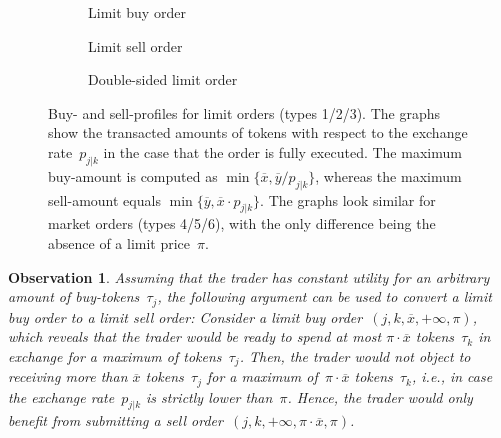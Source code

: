 \documentclass[11pt,parskip=full]{scrartcl}%
\newcommand*{\ie}{i.e., }
\newtheorem{observation}[theorem]{Observation}
\begin{document}
\begin{figure}
  \begin{subfigure}{0.45\textwidth}
    
    \caption{Limit buy order}
  \end{subfigure}
  \hfill
  \begin{subfigure}{0.45\textwidth}
    
    \caption{Limit sell order}
  \end{subfigure}

  \vspace{.8cm}
  \begin{subfigure}{0.45\textwidth}
    
    \caption{Double-sided limit order}
  \end{subfigure}
  \hfill
  \begin{subfigure}{0.45\textwidth}
  \end{subfigure}
  \caption{
    Buy- and sell-profiles for limit orders (types 1/2/3).
    The graphs show the transacted amounts of tokens with respect to the exchange rate~$p_{j|k}$
    in the case that the order is fully executed.
    The maximum buy-amount is computed as $\min\{\overline{x},\overline{y}/p_{j|k}\}$, whereas the
    maximum sell-amount equals $\min\{\overline{y},\overline{x} \cdot p_{j|k}\}$.
    The graphs look similar for market orders (types 4/5/6), with the only difference being the
    absence of a limit price~$\pi$.}
  \label{fig:buy_sell_demand}
\end{figure}

\vspace{.3cm}
\begin{observation}
  Assuming that the trader has constant utility for an arbitrary amount of buy-tokens~$\tau_j$, the following argument can be used to convert a limit buy order to a limit sell order:
  Consider a limit buy order~$(j,k,\overline{x},+\infty,\pi)$, which reveals that the trader would be ready to spend at most $\pi \cdot \overline{x}$ tokens~$\tau_k$ in exchange for a maximum of tokens~$\tau_j$.
  Then, the trader would not object to receiving more than $\overline{x}$ tokens~$\tau_j$ for a maximum of~$\pi \cdot \overline{x}$ tokens~$\tau_k$, \ie in case the exchange rate~$p_{j|k}$ is strictly lower than~$\pi$.
  Hence, the trader would only benefit from submitting a sell order~$(j,k,+\infty,\pi \cdot \overline{x},\pi)$.
\end{observation}
\end{document}
